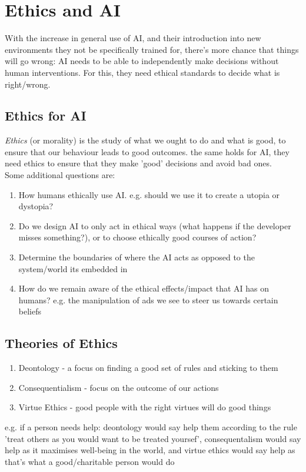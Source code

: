 \section{Ethics and AI}
With the increase in general use of AI, and their introduction into new environments they not be specifically trained for, there's more chance that things will go wrong: AI needs to be able to independently make decisions without human interventions. For this, they need ethical standards to decide what is right/wrong.

\subsection{Ethics for AI}
\emph{Ethics} (or morality) is the study of what we ought to do and what is good, to ensure that our behaviour leads to good outcomes. the same holds for AI, they need ethics to ensure that they make 'good' decisions and avoid bad ones. \\
Some additional questions are:
\begin{enumerate}
    \item How humans ethically use AI. e.g. should we use it to create a utopia or dystopia?
    \item Do we design AI to only act in ethical ways (what happens if the developer misses something?), or to choose ethically good courses of action?
    \item Determine the boundaries of where the AI acts as opposed to the system/world its embedded in
    \item How do we remain aware of the ethical effects/impact that AI has on humans? e.g. the manipulation of ads we see to steer us towards certain beliefs
\end{enumerate}

\subsection{Theories of Ethics}
\begin{enumerate}
    \item Deontology - a focus on finding a good set of rules and sticking to them
    \item Consequentialism - focus on the outcome of our actions
    \item Virtue Ethics - good people with the right virtues will do good things
\end{enumerate}
e.g. if a person needs help: deontology would say help them according to the rule 'treat others as you would want to be treated yoursef', consequentalism would say help as it maximises well-being in the world, and virtue ethics would say help as that's what a good/charitable person would do

